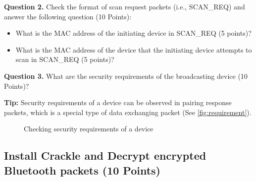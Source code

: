 \documentclass[11pt]{article}
\begin{document}
\begin{enumerate}
\textbf{Question 2.} Check the format of scan request packets (i.e.,  \textsf{SCAN\_REQ}) and answer the following question (10 Points):
\begin{itemize}
\item What is the MAC address of the initiating device in \textsf{SCAN\_REQ} (5 points)?
\item What is the MAC address of the device that the initiating device attempts to scan in \textsf{SCAN\_REQ}  (5 points)?
 
\end{itemize}

 

\textbf{Question 3.}  What are the security requirements of the broadcasting device (10 Points)? 

\textbf{Tip:} Security requirements of a device can be observed in pairing response packets, which is a special type of data exchanging packet  (See \autoref{fig:requirement}). 
 
\begin{figure}[h]
\centering
{}
\caption{\textsf{Checking security requirements of a device}}\label{fig:requirement}
\end{figure}  

\end{enumerate}


\subsection{Install \textsf{Crackle} and Decrypt encrypted Bluetooth packets (10 Points)}
\end{document}

